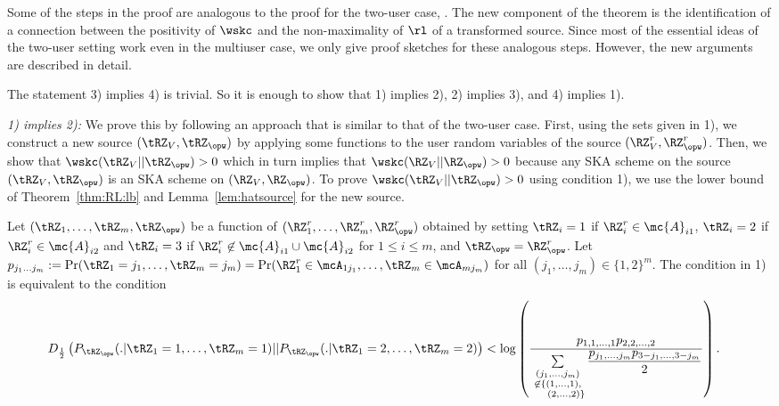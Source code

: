 Some of the steps in the proof are analogous to the proof for the two-user case, \cite[Theorem~4]{amin2020}.  The new component of the theorem is the identification of a connection between the positivity of $\wskc$ and the non-maximality of $\rl$ of a transformed source.
Since most of the essential ideas of the two-user setting work even in the multiuser case, we only give proof sketches for these analogous steps. However, the new arguments are described in detail.



The statement 3) implies 4) is trivial. So it is enough to show that 1) implies 2), 2) implies 3), and 4) implies 1).

\textit{1) implies 2):} We prove this by following an approach that is similar to that of the two-user case. First, using the sets given in 1), we construct a new source $(\tRZ_V,\tRZ_{\opw})$ by applying some functions to the user random variables of the source $(\RZ^r_V,\RZ^r_{\opw})$. Then, we show that $\wskc(\tRZ_V||\tRZ_{\opw})>0$ which in turn implies that $\wskc(\RZ_V||\RZ_{\opw})>0$ because any SKA scheme on the source $(\tRZ_V,\tRZ_{\opw})$ is an SKA scheme on $(\RZ_V,\RZ_{\opw})$. To prove $\wskc(\tRZ_V||\tRZ_{\opw})>0$ using condition 1), we use the lower bound of Theorem~\ref{thm:RL:lb} and Lemma~\ref{lem:hatsource} for the new source.


Let $(\tRZ_1,\ldots,\tRZ_m,\tRZ_{\opw})$ be a function of $(\RZ^r_1,\ldots,\RZ^r_m,\RZ^r_{\opw})$ obtained by setting $\tRZ_i = 1$ if $\RZ_i^r \in \mc{A}_{i1}$, $\tRZ_i = 2$ if $\RZ_i^r \in \mc{A}_{i2}$ and  $\tRZ_i = 3$ if $\RZ_i^r \not\in \mc{A}_{i1}\cup \mc{A}_{i2}$ for $1\leq i\leq m$, and $\tRZ_{\opw} = \RZ_{\opw}^r$. Let $p_{j_1\ldots j_m} :=\Pr(\tRZ_1=j_1, \ldots, \tRZ_m=j_m)= \Pr(\RZ^r_1 \in \mcA_{1j_1}, \ldots, \tRZ_m\in \mcA_{mj_m})$ for all $(j_1, \ldots, j_m) \in \{1,2\}^m$. The condition in 1) is equivalent  to the condition 
\begin{align*}
       &D_{\frac{1}{2}} \left(P_{\tRZ_{\opw}}(.|\tRZ_1=1, \ldots, \tRZ_m=1)  
       ||P_{\tRZ_{\opw}}(.|\tRZ_1=2, \ldots, \tRZ_m=2) \right)
       < \log \left(\frac{p_{1,1,\ldots,1}p_{2,2,\ldots,2}}{\sum \limits_{\substack{(j_1,\ldots,j_m)\\ \not\in \{(1,\ldots,1),\\\mkern 30mu (2,\ldots,2)\}}}\dfrac{p_{j_1, \ldots, j_m}p_{3-j_1,\ldots, 3-j_m}}{2}}\right).
 \end{align*}
 
